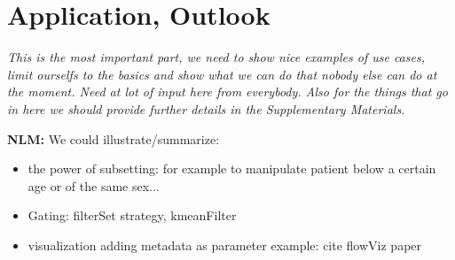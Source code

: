 \documentclass[12pt]{article}
\begin{document}
\section{Application, Outlook}
\textit{This is the most important part, we need to show nice examples
  of use cases, limit ourselfs to the basics and show what we can do
  that nobody else can do at the moment. Need at lot of input here
  from everybody. Also for the things that go in here we should
  provide further details in the Supplementary Materials.}


{\bf NLM:} We could illustrate/summarize:
\begin{itemize}
\item the power of subsetting: for example to manipulate 
patient below a certain age or of the same sex...
\item Gating: filterSet strategy, kmeanFilter
\item visualization adding metadata as parameter
example: cite flowViz paper
\end{itemize}



  
 
\end{document}
